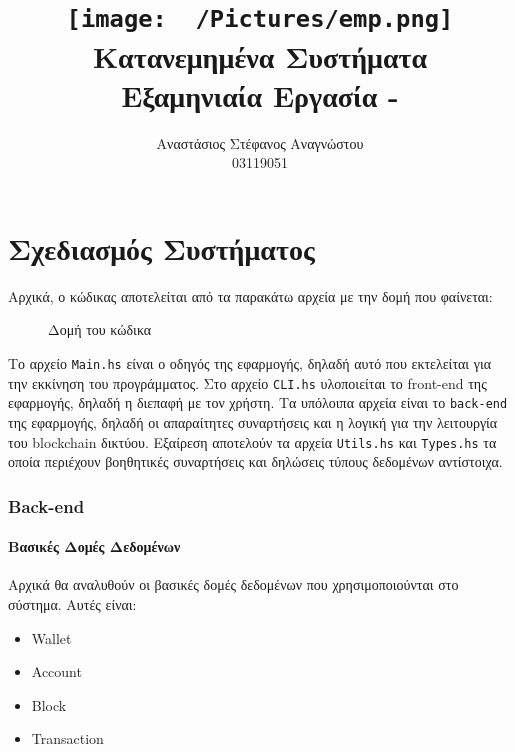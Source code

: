 \documentclass{article}
\title{
    \texttt{[image: ~/Pictures/emp.png]} \\
    \vskip 5cm
    Κατανεμημένα Συστήματα \\
    \large Εξαμηνιαία Εργασία - \eng{BlockChat} 
    \vskip 5cm
}
\author{ Αναστάσιος Στέφανος Αναγνώστου \\ \large 03119051 }
\newcommand{\eng}[1]{\foreignlanguage{english}{#1}} %
\begin{document}
\maketitle \clearpage \tableofcontents \clearpage

\part{Σχεδιασμός Συστήματος}

Αρχικά, ο κώδικας αποτελείται από τα παρακάτω αρχεία με την δομή που φαίνεται:

\begin{figure}[ht]
    \centering
    \begin{varwidth}{\linewidth}
        
    \end{varwidth}
    \caption{Δομή του κώδικα}
\end{figure}

Το αρχείο \texttt{\eng{Main.hs}} είναι ο οδηγός της εφαρμογής, δηλαδή αυτό που
εκτελείται για την εκκίνηση του προγράμματος. Στο αρχείο \texttt{\eng{CLI.hs}}
υλοποιείται το \eng{front-end} της εφαρμογής, δηλαδή η διεπαφή με τον χρήστη.
Τα υπόλοιπα αρχεία είναι το \texttt{\eng{back-end}} της εφαρμογής, δηλαδή οι απαραίτητες
συναρτήσεις και η λογική για την λειτουργία του \eng{blockchain} δικτύου. Εξαίρεση
αποτελούν τα αρχεία \texttt{\eng{Utils.hs}} και \texttt{\eng{Types.hs}} τα οποία
περιέχουν βοηθητικές συναρτήσεις και δηλώσεις τύπους δεδομένων αντίστοιχα.

\section{\eng{Back-end}}

\subsection{Βασικές Δομές Δεδομένων}

Αρχικά θα αναλυθούν οι βασικές δομές δεδομένων που χρησιμοποιούνται στο
σύστημα. Αυτές είναι:

\begin{itemize}
    \item Wallet
    \item Account
    \item Block
    \item Transaction
\end{itemize}
\end{document}
